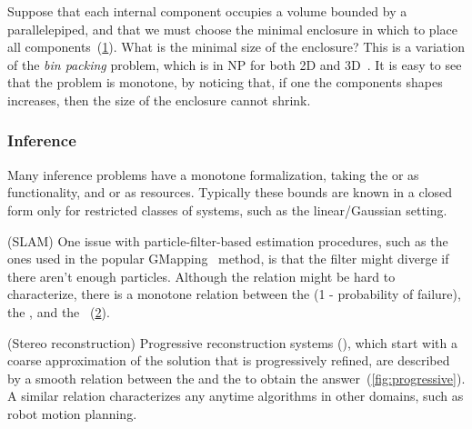 \begin{example}
    Suppose that each internal component occupies a volume
    bounded by a parallelepiped, and that we must choose the minimal enclosure
    in which to place all components~(\cref{fig:packing}). What
    is the minimal size of the enclosure? This is a variation of the \emph{bin
    packing} problem, which is in NP for both 2D and 3D~\cite{lodi02two}.
    It is easy to see that the problem is monotone, by noticing that,
    if one the components shapes increases, then the size of the enclosure
    cannot shrink.
\end{example}
\begin{figure}[tbh]
    \centering
    \caption{\label{fig:packing}}
\end{figure}

\subsubsection{Inference}

Many inference problems have a monotone formalization, taking the
 or  as functionality, and 
or  as resources. Typically these bounds are known in
a closed form only for restricted classes of systems, such as the
linear/Gaussian setting.

\begin{example}
(SLAM)
    One issue with particle-filter-based estimation procedures,
    such as the ones used in the popular GMapping~\cite{grisetti07improved}
    method, is that the filter might diverge if there aren't enough particles.
    Although the relation might be hard to characterize, there is a monotone
    relation between the  (1 - probability of failure),
    the , and the ~(\cref{fig:gmapping}).
\end{example}
\begin{figure}[h]
    \centering
    \caption{\label{fig:gmapping}}
\end{figure}



\begin{example}
(Stereo reconstruction)
    Progressive reconstruction systems (\cite{locher16progressive}),
    which start with a coarse approximation of the solution that is progressively
    refined, are described by a smooth relation between the 
    and the  to obtain the answer~(\cref{fig:progressive}).
    A similar relation characterizes any anytime algorithms in other domains,
    such as robot motion planning.
\end{example}

